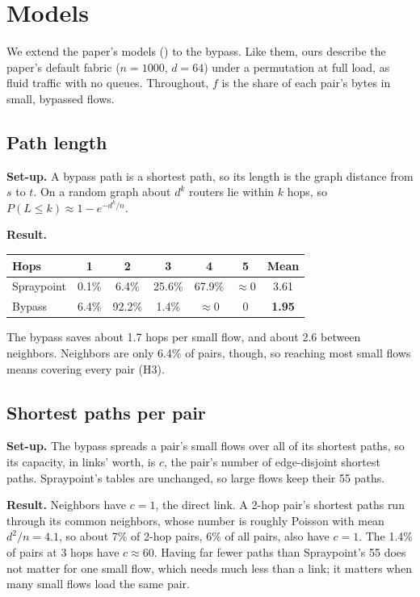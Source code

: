 \section{Models}
\label{sec:models}

We extend the paper's models () to the bypass. Like them, ours describe the paper's default fabric ($n = 1000$, $d = 64$) under a permutation at full load, as fluid traffic with no queues. Throughout, $f$ is the share of each pair's bytes in small, bypassed flows.

\subsection{Path length}
\label{sec:model-bypass-length}

\textbf{Set-up.} A bypass path is a shortest path, so its length is the graph distance from $s$ to $t$. On a random graph about $d^k$ routers lie within $k$ hops, so $P(L \le k) \approx 1 - e^{-d^k/n}$.

\textbf{Result.}

\begin{center}
\small
\begin{tabular}{@{}lccccc|c@{}}
\toprule
Hops & 1 & 2 & 3 & 4 & 5 & Mean \\
\midrule
Spraypoint & 0.1\% & 6.4\% & 25.6\% & 67.9\% & $\approx 0$ & 3.61 \\
Bypass & 6.4\% & 92.2\% & 1.4\% & $\approx 0$ & 0 & \textbf{1.95} \\
\bottomrule
\end{tabular}
\end{center}

The bypass saves about 1.7 hops per small flow, and about 2.6 between neighbors. Neighbors are only 6.4\% of pairs, though, so reaching most small flows means covering every pair (H3).

\subsection{Shortest paths per pair}
\label{sec:model-bypass-lanes}

\textbf{Set-up.} The bypass spreads a pair's small flows over all of its shortest paths, so its capacity, in links' worth, is $c$, the pair's number of edge-disjoint shortest paths. Spraypoint's tables are unchanged, so large flows keep their 55 paths.

\textbf{Result.} Neighbors have $c = 1$, the direct link. A 2-hop pair's shortest paths run through its common neighbors, whose number is roughly Poisson with mean $d^2/n = 4.1$, so about 7\% of 2-hop pairs, 6\% of all pairs, also have $c = 1$. The 1.4\% of pairs at 3 hops have $c \approx 60$. Having far fewer paths than Spraypoint's 55 does not matter for one small flow, which needs much less than a link; it matters when many small flows load the same pair.

